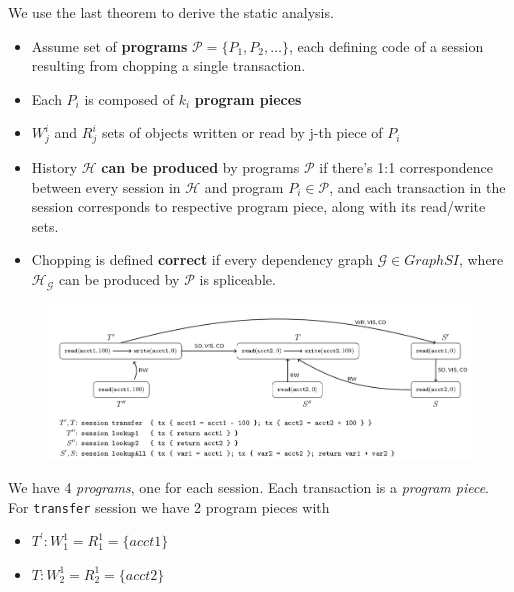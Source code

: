 \documentclass{beamer}
\begin{document}
\begin{frame}
We use the last theorem to derive the static analysis.
\begin{itemize}
	\item Assume set of \textbf{programs} $\mathcal{P}=\{P_1, P_2, \dots\}$, each defining code of a session resulting from chopping a single transaction.
	\item Each $P_i$ is composed of $k_i$ \textbf{program pieces}
	\item $W^i_j$ and $R^i_j$ sets of objects written or read by j-th piece of $P_i$ 
\end{itemize}
\end{frame}

\begin{frame}
	\begin{itemize}
		\item History $\mathcal{H}$ \textbf{can be produced} by programs $\mathcal{P}$ if there's 1:1 correspondence between every session in $\mathcal{H}$ and program $P_i\in\mathcal{P}$, and each transaction in the session corresponds to respective program piece, along with its read/write sets.
		\item Chopping is defined \textbf{correct} if every dependency graph $\mathcal{G}\in GraphSI$, where $\mathcal{H}_\mathcal{G}$ can be produced by $\mathcal{P}$ is spliceable.
	\end{itemize}
\end{frame}

\begin{frame}
	\begin{figure}
		\includegraphics[scale=0.28]{fig4}
	\end{figure}
	\begin{example}
		We have 4 \textit{programs}, one for each session. Each transaction is a \textit{program piece}. \\
		For \texttt{transfer} session we have 2 program pieces with
		\begin{itemize}
			\item $T^\prime: W^1_1 = R^1_1 = \{acct1\}$
			\item $T: W^1_2 = R^1_2 = \{acct2\}$
		\end{itemize}
	\end{example}
\end{frame}
\end{document}
